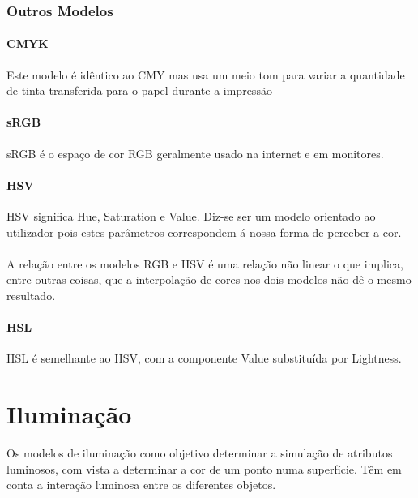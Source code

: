 \documentclass[10pt,a4paper]{report}
\begin{document}
\subsection{Outros Modelos}
\subsubsection{CMYK}
Este modelo é idêntico ao CMY mas usa um meio tom para variar a quantidade de tinta transferida para o papel durante a impressão
\subsubsection{sRGB}
sRGB é o espaço de cor RGB geralmente usado na internet e em monitores.
\subsubsection{HSV}
HSV significa Hue, Saturation e Value. Diz-se ser um modelo orientado ao utilizador pois estes parâmetros correspondem á nossa forma de perceber a cor.\\
\\
A relação entre os modelos RGB e HSV é uma relação não linear o que implica, entre outras coisas, que a interpolação de cores nos dois modelos não dê o mesmo resultado.
\subsubsection{HSL}
HSL é semelhante ao HSV, com a componente Value substituída por Lightness. 
\chapter{Iluminação}
Os modelos de iluminação como objetivo determinar a simulação de atributos luminosos, com vista a determinar a cor de um ponto numa superfície. Têm em conta a interação luminosa entre os diferentes objetos.
\end{document}

